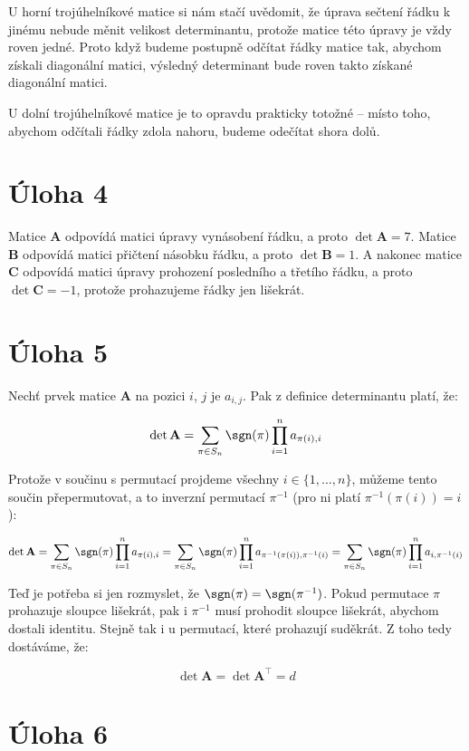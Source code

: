 \documentclass{fkssolpub}
\begin{document}
U horní trojúhelníkové matice si nám stačí uvědomit, že úprava sečtení řádku k jinému nebude měnit velikost determinantu, protože matice této úpravy je vždy roven jedné. Proto když budeme postupně odčítat řádky matice tak, abychom získali diagonální matici, výsledný determinant bude roven takto získané diagonální matici.

U dolní trojúhelníkové matice je to opravdu prakticky totožné -- místo toho, abychom odčítali řádky zdola nahoru, budeme odečítat shora dolů.

\section{Úloha 4}

Matice $\mathbf{A}$ odpovídá matici úpravy vynásobení řádku, a proto $\det \mathbf{A} = 7$. Matice $\mathbf{B}$ odpovídá matici přičtení násobku řádku, a proto $\det \mathbf{B} = 1$. A nakonec matice $\mathbf{C}$ odpovídá matici úpravy prohození posledního a třetího řádku, a proto $\det \mathbf{C} = -1$, protože prohazujeme řádky jen lišekrát.

\section{Úloha 5}

Nechť prvek matice $\mathbf{A}$ na pozici $i$, $j$ je $a_{i,j}$. Pak z definice determinantu platí, že:

\[
  \det \mathbf{A} = \sum_{\pi \in S_n} \sgn(\pi) \prod_{i = 1}^n a_{\pi(i), i}
\]

Protože v součinu s permutací projdeme všechny $i \in \{1, ..., n\}$, můžeme tento součin přepermutovat, a to inverzní permutací $\pi^{-1}$ (pro ni platí $\pi^{-1}(\pi(i)) = i$):

\[
  \det \mathbf{A} = \sum_{\pi \in S_n} \sgn(\pi) \prod_{i = 1}^n a_{\pi(i), i} = \sum_{\pi \in S_n} \sgn(\pi) \prod_{i = 1}^n a_{\pi^{-1}(\pi(i)), \pi^{-1}(i)} = \sum_{\pi \in S_n} \sgn(\pi) \prod_{i = 1}^n a_{i, \pi^{-1}(i)} 
\]

Teď je potřeba si jen rozmyslet, že $\sgn(\pi) = \sgn(\pi^{-1})$. Pokud permutace $\pi$ prohazuje sloupce lišekrát, pak i $\pi^{-1}$ musí prohodit sloupce lišekrát, abychom dostali identitu. Stejně tak i u permutací, které prohazují suděkrát. Z toho tedy dostáváme, že:

\[
  \det \mathbf{A} = \det \mathbf{A}^{\top} = d
\]

\section{Úloha 6}
\end{document}
